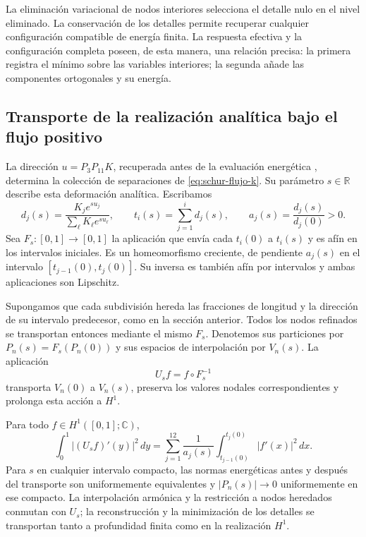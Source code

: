 La eliminación variacional de nodos interiores selecciona el detalle
nulo en el nivel eliminado. La conservación de los detalles permite
recuperar cualquier configuración compatible de energía finita. La
respuesta efectiva y la configuración completa poseen, de esta manera,
una relación precisa: la primera registra el mínimo sobre las variables
interiores; la segunda añade las componentes ortogonales y su energía.

\subsection{Transporte de la realización analítica bajo el flujo positivo}

La dirección \(u=P_3P_{11}K\), recuperada antes de la evaluación
energética \cite{hmtX}, determina la colección de separaciones de
\eqref{eq:schur-flujo-k}. Su parámetro \(s\in\mathbb R\)
describe esta deformación analítica. Escribamos
\[
 d_j(s)=\frac{K_je^{su_j}}{\sum_\ell K_\ell e^{su_\ell}},
 \qquad
 t_i(s)=\sum_{j=1}^id_j(s),
 \qquad
 a_j(s)=\frac{d_j(s)}{d_j(0)}>0.
\]
Sea \(F_s:[0,1]\to[0,1]\) la aplicación que envía cada
\(t_i(0)\) a \(t_i(s)\) y es afín en los intervalos iniciales.
Es un homeomorfismo creciente, de pendiente \(a_j(s)\) en el
intervalo \([t_{j-1}(0),t_j(0)]\). Su inversa es también afín
por intervalos y ambas aplicaciones son Lipschitz.

Supongamos que cada subdivisión hereda las fracciones de longitud y la
dirección de su intervalo predecesor, como en la sección anterior. Todos
los nodos refinados se transportan entonces mediante el mismo \(F_s\).
Denotemos sus particiones por \(P_n(s)=F_s(P_n(0))\) y sus
espacios de interpolación por \(V_n(s)\). La aplicación
\[
 U_s f=f\circ F_s^{-1}
\]
transporta \(V_n(0)\) a \(V_n(s)\), preserva los valores
nodales correspondientes y prolonga esta acción a \(H^1\).

\begin{theorem}
\label{thm:transporte-h1-flujo-k}
Para todo \(f\in H^1([0,1];\mathbb C)\),
\begin{equation}
 \int_0^1|(U_sf)'(y)|^2\,dy
 =\sum_{j=1}^{12}\frac1{a_j(s)}
 \int_{t_{j-1}(0)}^{t_j(0)}|f'(x)|^2\,dx.
 \label{eq:transporte-energia-h1-k}
\end{equation}
Para \(s\) en cualquier intervalo compacto, las normas energéticas
antes y después del transporte son uniformemente equivalentes y
\(|P_n(s)|\to0\) uniformemente en ese compacto. La interpolación
armónica y la restricción a nodos heredados conmutan con \(U_s\);
la reconstrucción y la minimización de los detalles se transportan
tanto a profundidad finita como en la realización \(H^1\).
\end{theorem}

